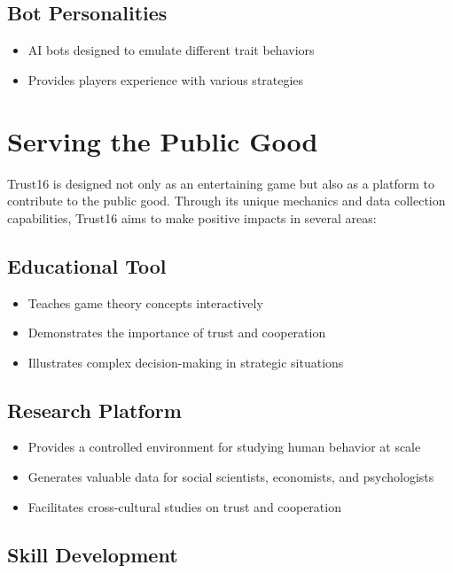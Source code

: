 \documentclass[]{article}
\begin{document}
\subsection{Bot Personalities}

\begin{itemize}
\item AI bots designed to emulate different trait behaviors
\item Provides players experience with various strategies
\end{itemize}

\section{Serving the Public Good}

Trust16 is designed not only as an entertaining game but also as a platform to contribute to the public good. Through its unique mechanics and data collection capabilities, Trust16 aims to make positive impacts in several areas:

\subsection{Educational Tool}

\begin{itemize}
\item Teaches game theory concepts interactively
\item Demonstrates the importance of trust and cooperation
\item Illustrates complex decision-making in strategic situations
\end{itemize}

\subsection{Research Platform}

\begin{itemize}
\item Provides a controlled environment for studying human behavior at scale
\item Generates valuable data for social scientists, economists, and psychologists
\item Facilitates cross-cultural studies on trust and cooperation
\end{itemize}

\subsection{Skill Development}
\end{document}
